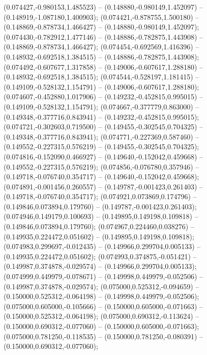  (0.074427,-0.980153,1.485523) -- (0.148880,-0.980149,1.452097) -- (0.148919,-1.087180,1.400903);
 (0.074421,-0.878755,1.500180) -- (0.148869,-0.878734,1.466427) -- (0.148880,-0.980149,1.452097);
 (0.074430,-0.782912,1.477146) -- (0.148886,-0.782875,1.443908) -- (0.148869,-0.878734,1.466427);
 (0.074454,-0.692569,1.416396) -- (0.148932,-0.692518,1.384515) -- (0.148886,-0.782875,1.443908);
 (0.074492,-0.607677,1.317858) -- (0.149006,-0.607617,1.288180) -- (0.148932,-0.692518,1.384515);
 (0.074544,-0.528197,1.181415) -- (0.149109,-0.528132,1.154791) -- (0.149006,-0.607617,1.288180);
 (0.074607,-0.452880,1.017906) -- (0.149232,-0.452815,0.995015) -- (0.149109,-0.528132,1.154791);
 (0.074667,-0.377779,0.863000) -- (0.149348,-0.377716,0.843941) -- (0.149232,-0.452815,0.995015);
 (0.074721,-0.302603,0.719500) -- (0.149455,-0.302545,0.704325) -- (0.149348,-0.377716,0.843941);
 (0.074771,-0.227369,0.587460) -- (0.149552,-0.227315,0.576219) -- (0.149455,-0.302545,0.704325);
 (0.074816,-0.152090,0.466927) -- (0.149640,-0.152042,0.459668) -- (0.149552,-0.227315,0.576219);
 (0.074856,-0.076780,0.357946) -- (0.149718,-0.076740,0.354717) -- (0.149640,-0.152042,0.459668);
 (0.074891,-0.001456,0.260557) -- (0.149787,-0.001423,0.261403) -- (0.149718,-0.076740,0.354717);
 (0.074921,0.073869,0.174796) -- (0.149846,0.073894,0.179760) -- (0.149787,-0.001423,0.261403);
 (0.074946,0.149179,0.100693) -- (0.149895,0.149198,0.109818) -- (0.149846,0.073894,0.179760);
 (0.074967,0.224460,0.038276) -- (0.149935,0.224472,0.051602) -- (0.149895,0.149198,0.109818);
 (0.074983,0.299697,-0.012435) -- (0.149966,0.299704,0.005133) -- (0.149935,0.224472,0.051602);
 (0.074993,0.374875,-0.051421) -- (0.149987,0.374878,-0.029574) -- (0.149966,0.299704,0.005133);
 (0.074999,0.449979,-0.078671) -- (0.149998,0.449979,-0.052506) -- (0.149987,0.374878,-0.029574);
 (0.075000,0.525312,-0.094659) -- (0.150000,0.525312,-0.064198) -- (0.149998,0.449979,-0.052506);
 (0.075000,0.605000,-0.105666) -- (0.150000,0.605000,-0.071663) -- (0.150000,0.525312,-0.064198);
 (0.075000,0.690312,-0.113624) -- (0.150000,0.690312,-0.077060) -- (0.150000,0.605000,-0.071663);
 (0.075000,0.781250,-0.118535) -- (0.150000,0.781250,-0.080391) -- (0.150000,0.690312,-0.077060);
